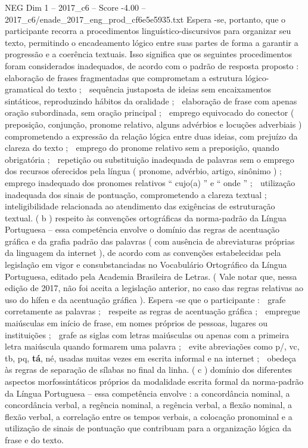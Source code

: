 \begin{textsample}{NEG Dim 1 – 2017\_c6 – Score -4.00 – 2017\_c6/enade\_2017\_eng\_prod\_cf6e5e5935.txt}
Espera -se, portanto, que o participante recorra a procedimentos linguístico-discursivos para organizar seu texto, permitindo o encadeamento lógico entre suas partes de forma a garantir a progressão e a coerência textuais.
Isso significa que os seguintes procedimentos foram considerados inadequados, de acordo com o padrão de resposta proposto :  elaboração de frases fragmentadas que comprometam a estrutura lógico-gramatical do texto ;  sequência justaposta de ideias sem encaixamentos sintáticos, reproduzindo hábitos da oralidade ;  elaboração de frase com apenas oração subordinada, sem oração principal ;  emprego equivocado do conector ( preposição, conjunção, pronome relativo, alguns advérbios e locuções adverbiais ) comprometendo a expressão da relação lógica entre duas ideias, com prejuízo da clareza do texto ;  emprego do pronome relativo sem a preposição, quando obrigatória ;  repetição ou substituição inadequada de palavras sem o emprego dos recursos oferecidos pela língua ( pronome, advérbio, artigo, sinônimo ) ;  emprego inadequado dos pronomes relativos “ cujo(a) ” e “ onde ” ;  utilização inadequada dos sinais de pontuação, comprometendo a clareza textual ;  inteligibilidade relacionada ao atendimento das exigências de estruturação textual. ( b ) respeito às convenções ortográficas da norma-padrão da Língua Portuguesa – essa competência envolve o domínio das regras de acentuação gráfica e da grafia padrão das palavras ( com ausência de abreviaturas próprias da linguagem da internet ), de acordo com as convenções estabelecidas pela legislação em vigor e consubstanciadas no Vocabulário Ortográfico da Língua Portuguesa, editado pela Academia Brasileira de Letras. ( Vale notar que, nessa edição de 2017, não foi aceita a legislação anterior, no caso das regras relativas ao uso do hífen e da acentuação gráfica ).
Espera -se que o participante :  grafe corretamente as palavras ;  respeite as regras de acentuação gráfica ;  empregue maiúsculas em início de frase, em nomes próprios de pessoas, lugares ou instituições ;  grafe as siglas com letras maiúsculas ou apenas com a primeira letra maiúscula quando formarem uma palavra ;  evite abreviações como p/, vc, tb, pq, \textbf{tá}, né, usadas muitas vezes em escrita informal e na internet ;  obedeça às regras de separação de sílabas no final da linha. ( c ) domínio dos diferentes aspectos morfossintáticos próprios da modalidade escrita formal da norma-padrão da Língua Portuguesa – essa competência envolve : a concordância nominal, a concordância verbal, a regência nominal, a regência verbal, a flexão nominal, a flexão verbal, a correlação entre os tempos verbais, a colocação pronominal e a utilização de sinais de pontuação que contribuam para a organização lógica da frase e do texto.

\end{textsample}
